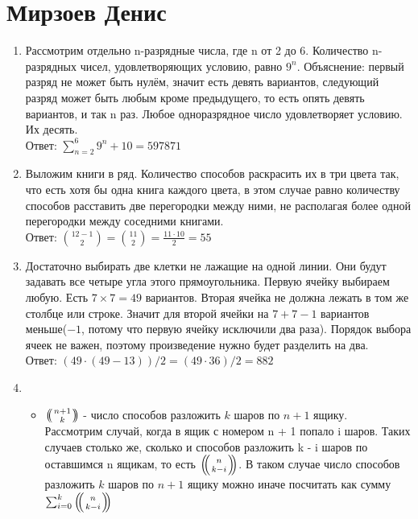 \documentclass{article}
\def\multiset#1#2{
    \ensuremath{\left(\kern-.3em\left(\genfrac{}{}{0pt}{}{#1}{#2}\right)\kern-.3em\right)}
}
\begin{document}
\section{Мирзоев Денис}

\begin{enumerate}

\item Рассмотрим отдельно n-разрядные числа, где n от 2 до 6. Количество
n-разрядных чисел, удовлетворяющих условию, равно $9^n$. Объяснение: первый
разряд не может быть нулём, значит есть девять вариантов, следующий разряд
может быть любым кроме предыдущего, то есть опять девять вариантов, и так n
раз. Любое одноразрядное число удовлетворяет условию. Их десять.\\
Ответ: $\sum_{n=2}^{6}9^n+10 = 597871$

\item Выложим книги в ряд. Количество способов раскрасить их в три цвета так,
что есть хотя бы одна книга каждого цвета, в этом случае равно количеству
способов расставить две перегородки между ними, не располагая более одной
перегородки между соседними книгами.\\
Ответ: ${12 - 1 \choose 2} = {11 \choose 2} = \frac{11 \cdot 10}{2} = 55$

\item Достаточно выбирать две клетки не лажащие на одной линии. Они будут
задавать все четыре угла этого прямоугольника. Первую ячейку выбираем любую.
Есть $7 \times 7 = 49$ вариантов. Вторая ячейка не должна лежать в том же
столбце или строке. Значит для второй ячейки на $7 + 7 - 1$ вариантов меньше($
- 1$, потому что первую ячейку исключили два раза). Порядок выбора ячеек не
важен, поэтому произведение нужно будет разделить на два.\\
Ответ: $(49 \cdot (49 - 13)) / 2 = (49 \cdot 36) / 2 = 882 $

\item 

\begin{itemize}

\item $\multiset{n + 1}{k}$ - число способов разложить $k$ шаров по $n + 1$ ящику.\\
Рассмотрим случай, когда в ящик с номером n + 1 попало i шаров. Таких случаев
столько же, сколько и способов разложить k - i шаров по оставшимся n ящикам, то
есть $\multiset{n}{k - i}$. В таком случае число способов разложить $k$ шаров
по $n + 1$ ящику можно иначе посчитать как сумму 
$\sum_{i = 0}^{k}\multiset{n}{k-i}$


\end{itemize}
\end{enumerate}
\end{document}
